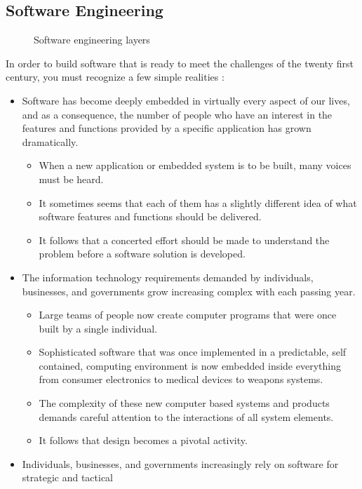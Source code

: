 \documentclass{article}
\begin{document}
	\subsection{Software Engineering}
	\begin{figure}[H]
		\centering
		
		\caption{Software engineering layers}
	\end{figure}

	\noindent In order to build software that is ready to meet the challenges of the twenty first century, you
	must recognize a few simple realities :
	\begin{itemize}
		\item Software has become deeply embedded in virtually every aspect of our lives, and as a consequence,
				the number of people who have an interest in the features and functions provided by a specific
				application has grown dramatically.
			\begin{itemize}
				\item When a new application or embedded system is to be built, many voices must be heard.
				\item It sometimes seems that each of them has a slightly different idea of what software
					features and functions should be delivered.
				\item It follows that a concerted effort should be made to understand the problem before a
					software solution is developed.
			\end{itemize}
		\item The information technology requirements demanded by individuals, businesses, and governments grow
			increasing complex with each passing year.
			\begin{itemize}
				\item Large teams of people now create computer programs that were once built by a single
					individual.
				\item Sophisticated software that was once implemented in a predictable, self contained,
					computing environment is now embedded inside everything from consumer electronics to medical
					devices to weapons systems.
				\item The complexity of these new computer based systems and products demands careful attention
					to the interactions of all system elements.
				\item It follows that design becomes a pivotal activity.
			\end{itemize}
		\item Individuals, businesses, and governments increasingly rely on software for strategic and tactical

\end{itemize}
\end{document}

